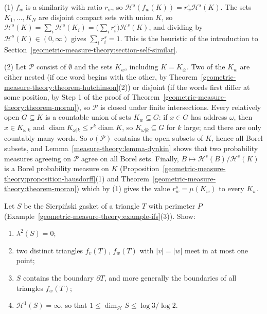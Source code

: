 \begin{solution}
(1) $f_w$ is a similarity with ratio $r_w$, so $\mathcal{H}^s(f_w(K)) = r_w^s\mathcal{H}^s(K)$. The sets $K_1, \ldots, K_N$ are disjoint compact sets with union $K$, so
$\mathcal{H}^s(K) = \sum_i\mathcal{H}^s(K_i) = \bigl(\sum_ir_i^s\bigr)\mathcal{H}^s(K)$, and dividing by $\mathcal{H}^s(K) \in (0, \infty)$ gives $\sum_ir_i^s = 1$. This is the heuristic of the introduction
to Section~\ref{geometric-measure-theory:section-self-similar}.

(2) Let $\mathcal{P}$ consist of $\emptyset$ and the sets $K_w$, including $K = K_\varnothing$. Two of the $K_w$ are either nested (if one word begins with the other, by
Theorem~\ref{geometric-measure-theory:theorem-hutchinson}(2)) or disjoint (if the words first differ at some position, by Step 1 of the proof of Theorem~\ref{geometric-measure-theory:theorem-moran}), so $\mathcal{P}$ is
closed under finite intersections. Every relatively open $G \subseteq K$ is a countable union of sets $K_w \subseteq G$: if $x \in G$ has address $\omega$, then $x \in K_{\omega|k}$ and
$\operatorname{diam}K_{\omega|k} \leq r^k\operatorname{diam}K$, so $K_{\omega|k} \subseteq G$ for $k$ large; and there are only countably many words. So $\sigma(\mathcal{P})$ contains the open subsets of
$K$, hence all Borel subsets, and Lemma~\ref{measure-theory:lemma-dynkin} shows that two probability measures agreeing on $\mathcal{P}$ agree on all Borel sets. Finally,
$B \mapsto \mathcal{H}^s(B)/\mathcal{H}^s(K)$ is a Borel probability measure on $K$ (Proposition~\ref{geometric-measure-theory:proposition-hausdorff}(1) and Theorem~\ref{geometric-measure-theory:theorem-moran}) which by (1)
gives the value $r_w^s = \mu(K_w)$ to every $K_w$.
\end{solution}

\begin{exercise}\label{geometric-measure-theory:exercise-sierpinski}
Let $S$ be the Sierpi\'nski gasket of a triangle $T$ with perimeter $P$ (Example~\ref{geometric-measure-theory:example-ifs}(3)). Show:
\begin{enumerate}
\item $\lambda^2(S) = 0$;
\item two distinct triangles $f_v(T)$, $f_w(T)$ with $|v| = |w|$ meet in at most one point;
\item $S$ contains the boundary $\partial T$, and more generally the boundaries of all triangles $f_w(T)$;
\item $\mathcal{H}^1(S) = \infty$, so that $1 \leq \dim_{\mathcal{H}}S \leq \log 3/\log 2$.
\end{enumerate}
\end{exercise}

